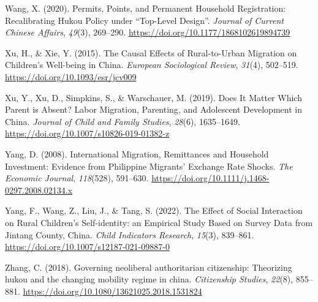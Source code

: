 \documentclass[
  man,floatsintext]{apa7}
\newlength{\cslhangindent}
\newlength{\cslentryspacingunit} %
\newenvironment{CSLReferences}[2] %
 {%
  \setlength{\parindent}{0pt}
  \ifodd #1
  \let\oldpar\par
  \def\par{\hangindent=\cslhangindent\oldpar}
  \fi
  \setlength{\parskip}{#2\cslentryspacingunit}
 }%
 {}
\begin{document}
\begin{CSLReferences}{1}{0}
\leavevmode{}%
Wang, X. (2020). Permits, Points, and Permanent Household Registration: Recalibrating Hukou Policy under {``}Top-Level Design{''}. \emph{Journal of Current Chinese Affairs}, \emph{49}(3), 269--290. \url{https://doi.org/10.1177/1868102619894739}

\leavevmode{}%
Xu, H., \& Xie, Y. (2015). The Causal Effects of Rural-to-Urban Migration on Children{'}s Well-being in China. \emph{European Sociological Review}, \emph{31}(4), 502--519. \url{https://doi.org/10.1093/esr/jcv009}

\leavevmode{}%
Xu, Y., Xu, D., Simpkins, S., \& Warschauer, M. (2019). Does It Matter Which Parent is Absent? Labor Migration, Parenting, and Adolescent Development in China. \emph{Journal of Child and Family Studies}, \emph{28}(6), 1635--1649. \url{https://doi.org/10.1007/s10826-019-01382-z}

\leavevmode{}%
Yang, D. (2008). International Migration, Remittances and Household Investment: Evidence from Philippine Migrants{'} Exchange Rate Shocks. \emph{The Economic Journal}, \emph{118}(528), 591--630. \url{https://doi.org/10.1111/j.1468-0297.2008.02134.x}

\leavevmode{}%
Yang, F., Wang, Z., Liu, J., \& Tang, S. (2022). The Effect of Social Interaction on Rural Children{'}s Self-identity: an Empirical Study Based on Survey Data from Jintang County, China. \emph{Child Indicators Research}, \emph{15}(3), 839--861. \url{https://doi.org/10.1007/s12187-021-09887-0}

\leavevmode{}%
Zhang, C. (2018). Governing neoliberal authoritarian citizenship: Theorizing hukou and the changing mobility regime in china. \emph{Citizenship Studies}, \emph{22}(8), 855--881. \url{https://doi.org/10.1080/13621025.2018.1531824}

\end{CSLReferences}
\end{document}
